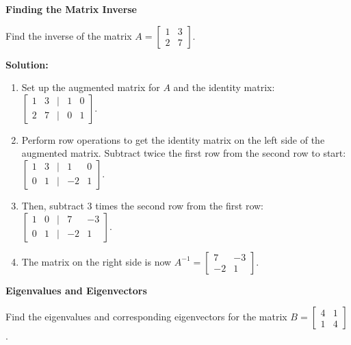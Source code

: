\documentclass[8pt, a4paper, landscape]{extarticle}
\begin{document}
\begin{multicols*}{4}
  \columnbreak

  \textbf{Finding the Matrix Inverse}

  Find the inverse of the matrix $A = \begin{bmatrix} 1 & 3 \\ 2 & 7 \end{bmatrix}$.

  \textbf{Solution:}
  \begin{enumerate}
    \item Set up the augmented matrix for $A$ and the identity matrix: $\begin{bmatrix} 1 & 3 & | & 1 & 0 \\ 2 & 7 & | & 0 & 1 \end{bmatrix}$.
    \item Perform row operations to get the identity matrix on the left side of the augmented matrix. Subtract twice the first row from the second row to start: $\begin{bmatrix} 1 & 3 & | & 1 & 0 \\ 0 & 1 & | & -2 & 1 \end{bmatrix}$.
    \item Then, subtract 3 times the second row from the first row: $\begin{bmatrix} 1 & 0 & | & 7 & -3 \\ 0 & 1 & | & -2 & 1 \end{bmatrix}$.
    \item The matrix on the right side is now $A^{-1} = \begin{bmatrix} 7 & -3 \\ -2 & 1 \end{bmatrix}$.
  \end{enumerate}

  \textbf{Eigenvalues and Eigenvectors}

  Find the eigenvalues and corresponding eigenvectors for the matrix $B = \begin{bmatrix} 4 & 1 \\ 1 & 4 \end{bmatrix}$.


\end{multicols*}
\end{document}
